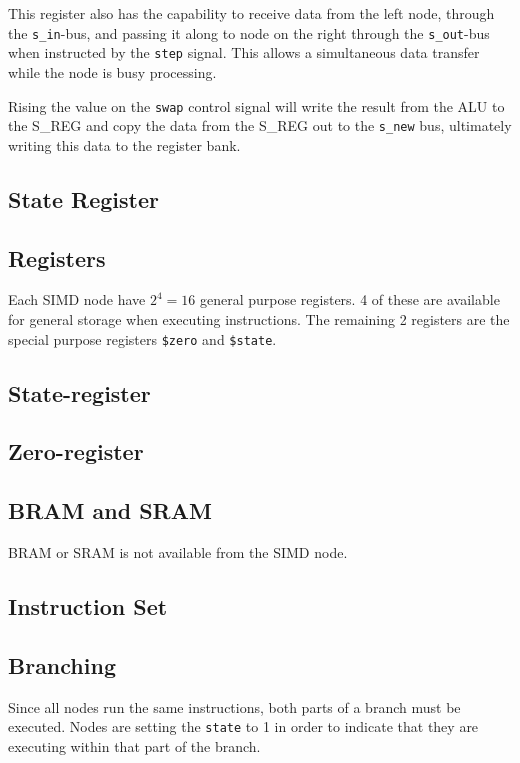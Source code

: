 This register also has the capability to receive data from the left node,
through the {\tt s\_in}-bus, and passing it along to node on the right through
the {\tt s\_out}-bus when instructed by the {\tt step} signal. This allows a
simultaneous data transfer while the node is busy processing.

Rising the value on the {\tt swap} control signal will write the result from the
ALU to the S\_REG and copy the data from the S\_REG out to the {\tt s\_new} bus,
ultimately writing this data to the register bank.

\subsection{State Register}

\subsection{Registers}
Each SIMD node have $2^4 = 16$ general purpose registers. 4 of these are
available for general storage when executing instructions. The remaining 2
registers are the special purpose registers {\tt \$zero} and {\tt \$state}.



\subsection{State-register}

\subsection{Zero-register}

\subsection{BRAM and SRAM}
BRAM or SRAM is not available from the SIMD node.

\subsection{Instruction Set}



\subsection{Branching}
Since all nodes run the same instructions, both parts of a branch must be
executed. Nodes are setting the {\tt state} to 1 in order to indicate that they
are executing within that part of the branch.

